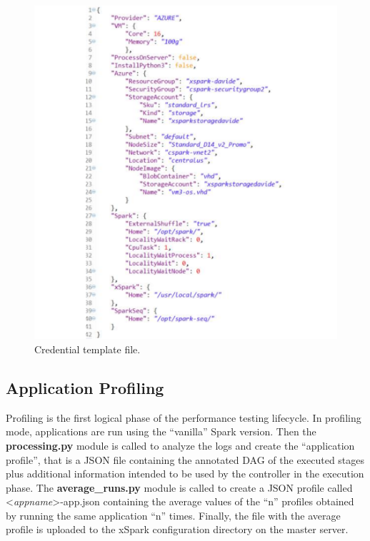 \begin{figure}[thbp]
	\hspace*{-2.5cm}
	\centering
	\includegraphics[width=18cm]{images/xspark_dagsymb_setup.pdf}
	\caption{Credential template file.}
	\label{fig:xspark_dagsymb_setup}
\end{figure}


\hypertarget{application-profiling}{%
\subsection{Application Profiling}\label{application-profiling}}

Profiling is the first logical phase of the performance testing
lifecycle. In profiling mode, applications are run using the ``vanilla''
Spark version. Then the \textbf{processing.py} module is called to
analyze the logs and create the ``application profile'', that is a JSON
file containing the annotated DAG of the executed stages plus additional
information intended to be used by the controller in the execution
phase. The \textbf{average\_runs.py} module is called to create a JSON
profile called <\emph{appname}>-app.json containing the
average values of the ``n'' profiles obtained by running the same
application ``n'' times. Finally, the file with the average profile is
uploaded to the xSpark configuration directory on the master server.

